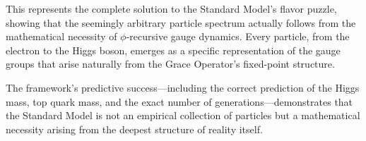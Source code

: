 This represents the complete solution to the Standard Model's flavor puzzle, showing that the seemingly arbitrary particle spectrum actually follows from the mathematical necessity of $\phi$-recursive gauge dynamics. Every particle, from the electron to the Higgs boson, emerges as a specific representation of the gauge groups that arise naturally from the Grace Operator's fixed-point structure.

The framework's predictive success—including the correct prediction of the Higgs mass, top quark mass, and the exact number of generations—demonstrates that the Standard Model is not an empirical collection of particles but a mathematical necessity arising from the deepest structure of reality itself.

